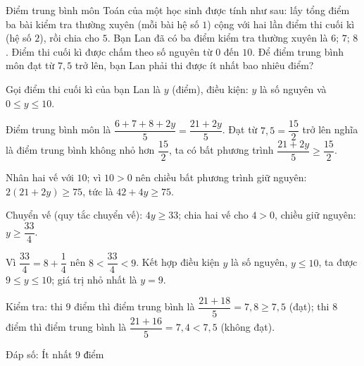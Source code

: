 \begin{problem}[9DS-BPT-041]
Điểm trung bình môn Toán của một học sinh được tính như sau: lấy tổng điểm ba bài kiểm tra thường xuyên (mỗi bài hệ số $1$) cộng với hai lần điểm thi cuối kì (hệ số $2$), rồi chia cho $5$. Bạn Lan đã có ba điểm kiểm tra thường xuyên là $6$; $7$; $8$. Điểm thi cuối kì được chấm theo số nguyên từ $0$ đến $10$. Để điểm trung bình môn đạt từ $7{,}5$ trở lên, bạn Lan phải thi được ít nhất bao nhiêu điểm?

\begin{solution}
Gọi điểm thi cuối kì của bạn Lan là $y$ (điểm), điều kiện: $y$ là số nguyên và $0 \leq y \leq 10$.

Điểm trung bình môn là $\dfrac{6 + 7 + 8 + 2y}{5} = \dfrac{21 + 2y}{5}$. Đạt từ $7{,}5 = \dfrac{15}{2}$ trở lên nghĩa là điểm trung bình không nhỏ hơn $\dfrac{15}{2}$, ta có bất phương trình $\dfrac{21 + 2y}{5} \geq \dfrac{15}{2}$.

Nhân hai vế với $10$; vì $10 > 0$ nên chiều bất phương trình giữ nguyên: $2(21 + 2y) \geq 75$, tức là $42 + 4y \geq 75$.

Chuyển vế (quy tắc chuyển vế): $4y \geq 33$; chia hai vế cho $4 > 0$, chiều giữ nguyên: $y \geq \dfrac{33}{4}$.

Vì $\dfrac{33}{4} = 8 + \dfrac{1}{4}$ nên $8 < \dfrac{33}{4} < 9$. Kết hợp điều kiện $y$ là số nguyên, $y \leq 10$, ta được $9 \leq y \leq 10$; giá trị nhỏ nhất là $y = 9$.

Kiểm tra: thi $9$ điểm thì điểm trung bình là $\dfrac{21 + 18}{5} = 7{,}8 \geq 7{,}5$ (đạt); thi $8$ điểm thì điểm trung bình là $\dfrac{21 + 16}{5} = 7{,}4 < 7{,}5$ (không đạt).

Đáp số: $\boxed{\text{Ít nhất } 9 \text{ điểm}}$
\end{solution}
\end{problem}


